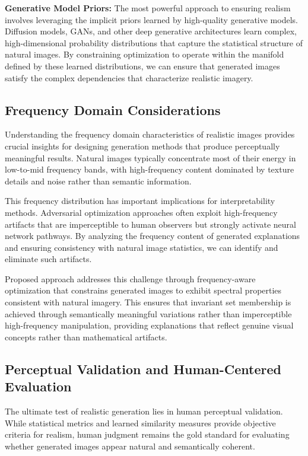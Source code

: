 \textbf{Generative Model Priors:} The most powerful approach to ensuring realism involves leveraging the implicit priors learned by high-quality generative models. Diffusion models, GANs, and other deep generative architectures learn complex, high-dimensional probability distributions that capture the statistical structure of natural images. By constraining optimization to operate within the manifold defined by these learned distributions, we can ensure that generated images satisfy the complex dependencies that characterize realistic imagery.

\subsection{Frequency Domain Considerations}

Understanding the frequency domain characteristics of realistic images provides crucial insights for designing generation methods that produce perceptually meaningful results. Natural images typically concentrate most of their energy in low-to-mid frequency bands, with high-frequency content dominated by texture details and noise rather than semantic information.

This frequency distribution has important implications for interpretability methods. Adversarial optimization approaches often exploit high-frequency artifacts that are imperceptible to human observers but strongly activate neural network pathways. By analyzing the frequency content of generated explanations and ensuring consistency with natural image statistics, we can identify and eliminate such artifacts.

Proposed approach addresses this challenge through frequency-aware optimization that constrains generated images to exhibit spectral properties consistent with natural imagery. This ensures that invariant set membership is achieved through semantically meaningful variations rather than imperceptible high-frequency manipulation, providing explanations that reflect genuine visual concepts rather than mathematical artifacts.

\subsection{Perceptual Validation and Human-Centered Evaluation}

The ultimate test of realistic generation lies in human perceptual validation. While statistical metrics and learned similarity measures provide objective criteria for realism, human judgment remains the gold standard for evaluating whether generated images appear natural and semantically coherent.

